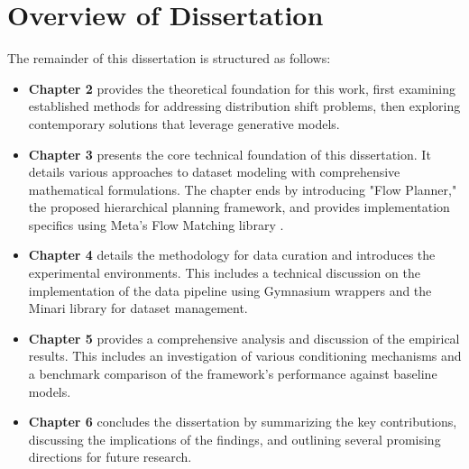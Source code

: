 \section{Overview of Dissertation}
The remainder of this dissertation is structured as follows:
\begin{itemize}
	\item \textbf{Chapter 2} provides the theoretical foundation for this work, first examining established methods for addressing distribution shift problems, then exploring contemporary solutions that leverage generative models.
	\item \textbf{Chapter 3} presents the core technical foundation of this dissertation. It details various approaches to dataset modeling with comprehensive mathematical formulations. The chapter ends by introducing "Flow Planner," the proposed hierarchical planning framework, and provides implementation specifics using Meta's Flow Matching library \cite{lipmanFlowMatchingGuide2024a}.
	\item \textbf{Chapter 4} details the methodology for data curation and introduces the experimental environments. This includes a technical discussion on the implementation of the data pipeline using Gymnasium\cite{towers2024gymnasium} wrappers and the Minari\cite{minari} library for dataset management.
	\item \textbf{Chapter 5} provides a comprehensive analysis and discussion of the empirical results. This includes an investigation of various conditioning mechanisms and a benchmark comparison of the framework's performance against baseline models.
	\item \textbf{Chapter 6} concludes the dissertation by summarizing the key contributions, discussing the implications of the findings, and outlining several promising directions for future research.
\end{itemize}
